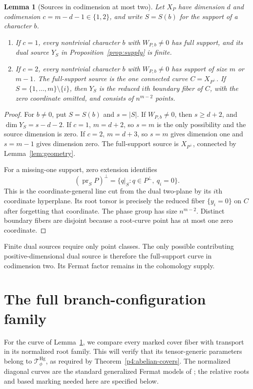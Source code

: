 \documentclass[11pt]{article}
\newcommand{\pr}{\operatorname{pr}}
\theoremstyle{plain}
\newtheorem{lemma}[theorem]{Lemma}
\theoremstyle{definition}
\theoremstyle{remark}
\numberwithin{equation}{section}
\begin{document}
\begin{lemma}[Sources in codimension at most two]\label{lem:one-curve}
Let \(X_P\) have dimension \(d\) and codimension
\(c=m-d-1\in\{1,2\}\), and write \(S=S(b)\) for the support of a
character \(b\).
\begin{enumerate}[label=\textup{(\roman*)}]
\item If \(c=1\), every nontrivial character \(b\) with \(W_{P,b}\ne0\)
has full support, and its dual source \(Y_S\) in
Proposition~\ref{prop:supply} is finite.
\item If \(c=2\), every nontrivial character \(b\) with \(W_{P,b}\ne0\)
has support of size \(m\) or \(m-1\).  The full-support source is the one connected
curve \(C=X_{P^\perp}\).  If \(S=\{1,\ldots,m\}\setminus\{i\}\),
then \(Y_S\) is the reduced \(i\)th boundary fiber of \(C\), with
the zero coordinate omitted, and consists of \(n^{m-2}\) points.
\end{enumerate}
\end{lemma}
\begin{proof}
For \(b\ne0\), put \(S=S(b)\) and \(s=|S|\).  If \(W_{P,b}\ne0\),
then \(s\geq d+2\), and \(\dim Y_S=s-d-2\).  If \(c=1\), \(m=d+2\), so \(s=m\) is the
only possibility and the source dimension is zero.  If \(c=2\),
\(m=d+3\), so \(s=m\) gives dimension one and \(s=m-1\) gives
dimension zero.  The full-support source is \(X_{P^\perp}\),
connected by Lemma~\ref{lem:geometry}.

For a missing-one support, zero extension identifies
\[
 (\pr_S P)^\perp=\{q|_S:q\in P^\perp,\ q_i=0\}.
\]
This is the coordinate-general line cut from the dual two-plane
by its \(i\)th coordinate hyperplane.  Its root torsor is precisely
the reduced fiber \(\{y_i=0\}\) on \(C\) after forgetting that
coordinate.  The phase group has size \(n^{m-2}\).  Distinct
boundary fibers are disjoint because a root-curve point has at
most one zero coordinate.
\end{proof}

Finite dual sources require only point classes.  The only possible
contributing positive-dimensional dual source is therefore the
full-support curve in codimension two.  Its Fermat factor remains
in the cohomology supply.

\section{The full branch-configuration family}\label{sec:family}
For the curve of Lemma~\ref{lem:one-curve}, we compare every marked
cover fiber with transport in its normalized root family.  This will
verify that its tensor-generic parameters belong to
$\mathcal T_\phi^{\mathrm{Hg}}$, as required by
Theorem~\ref{p4:abelian-covers}.
The normalized diagonal curves are the standard generalized
Fermat models of \cite{GDL,HKLP}; the relative roots and based
marking needed here are specified below.
\end{document}
